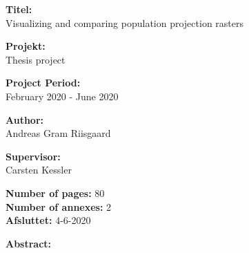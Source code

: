 \setcounter{page}{1}


\vspace*{1cm}

\begin{minipage}[t]{0.48\textwidth}
\textbf{Titel:} \\[5pt]\hspace{2ex}
Visualizing and comparing population 
projection rasters

\vspace*{1cm}

\textbf{Projekt:} \\[5pt]\bigskip\hspace{2ex}
Thesis project

\textbf{Project Period:} \\[5pt]\bigskip\hspace{2ex}
February 2020 - June 2020

\textbf{Author:} \\[5pt]\hspace*{2ex}
Andreas Gram Riisgaard 
\\\bigskip\hspace{2ex}


\textbf{Supervisor:} \\[5pt]\hspace*{2ex}
Carsten Kessler \\\bigskip\hspace{2ex}




\textbf{Number of pages:} 80 \\
\textbf{Number of annexes:} 2 \\ 
\textbf{Afsluttet:} 4-6-2020
 
\end{minipage}
\hfill
\begin{minipage}[t]{0.8\textwidth}%
 \textbf{Abstract:} \\[3pt]
 \fbox{\parbox{8cm}{\bigskip\bigskip}}
\end{minipage}

